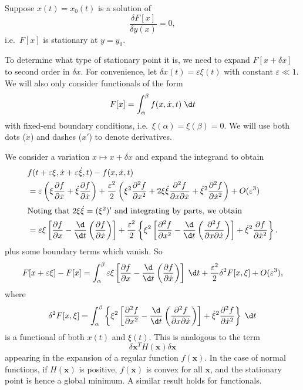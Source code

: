 \documentclass[a4paper]{article}
\begin{document}
Suppose $x(t) = x_0(t)$ is a solution of
\[
  \frac{\delta F[x]}{\delta y(x)} = 0,
\]
i.e.\ $F[x]$ is stationary at $y = y_0$.

To determine what type of stationary point it is, we need to expand $F[x + \delta x]$ to second order in $\delta x$. For convenience, let $\delta x(t) = \varepsilon \xi(t)$ with constant $\varepsilon \ll 1$. We will also only consider functionals of the form
\[
  F[x] = \int_\alpha^\beta f(x, \dot{x}, t)\;\d t
\]
with fixed-end boundary conditions, i.e.\ $\xi(\alpha) = \xi(\beta) = 0$. We will use both dots ($\dot{x}$) and dashes ($x'$) to denote derivatives.

We consider a variation $x \mapsto x + \delta x$ and expand the integrand to obtain
\begin{align*}
  &f(t + \varepsilon \xi, \dot{x} + \varepsilon \dot{\xi}, t) - f(x, \dot{x}, t)\\
  &= \varepsilon \left(\xi \frac{\partial f}{\partial \dot{x}} + \dot{\xi}\frac{\partial f}{\partial \dot{x}}\right) + \frac{\varepsilon^2}{2}\left(\xi^2 \frac{\partial^2 f}{\partial x^2} + 2\xi\dot{\xi} \frac{\partial^2 f}{\partial x \partial \dot{x}} + \dot{\xi}^2 \frac{\partial^2 f}{\partial \dot{x}^2}\right) + O(\varepsilon^3)\\
  \intertext{Noting that $2\xi \dot{\xi} = (\xi^2)'$ and integrating by parts, we obtain}
  &= \varepsilon \xi\left[\frac{\partial f}{\partial x} - \frac{\d}{\d t}\left(\frac{\partial f}{\partial \dot{x}}\right)\right] + \frac{\varepsilon^2}{2}\left\{\xi^2\left[\frac{\partial^2 f}{\partial x^2} - \frac{\d}{\d t}\left(\frac{\partial^2 f}{\partial x\partial \dot{x}}\right)\right] + \dot{\xi}^2 \frac{\partial f}{\partial \dot{x}^2}\right\}.
\end{align*}
plus some boundary terms which vanish. So
\[
  F[x + \varepsilon \xi] - F[x] = \int_\alpha^\beta\varepsilon\xi\left[\frac{\partial f}{\partial x} - \frac{\d}{\d t}\left(\frac{\partial f}{\partial \dot{x}}\right)\right]\;\d t + \frac{\varepsilon^2}{2}\delta^2 F[x, \xi] + O(\varepsilon^3),
\]
where
\[
  \delta^2 F[x, \xi] = \int_\alpha^\beta \left\{\xi^2 \left[\frac{\partial^2 f}{\partial x^2} - \frac{\d}{\d t}\left(\frac{\partial^2 f}{\partial x \partial \dot{x}}\right)\right] + \dot{\xi}^2 \frac{\partial^2 f}{\partial \dot{x}^2}\right\}\;\d t
\]
is a functional of both $x(t)$ and $\xi(t)$. This is analogous to the term
\[
  \delta \mathbf{x}^T H(\mathbf{x})\delta \mathbf{x}
\]
appearing in the expansion of a regular function $f(\mathbf{x})$. In the case of normal functions, if $H(\mathbf{x})$ is positive, $f(\mathbf{x})$ is convex for all $\mathbf{x}$, and the stationary point is hence a global minimum. A similar result holds for functionals.
\end{document}
